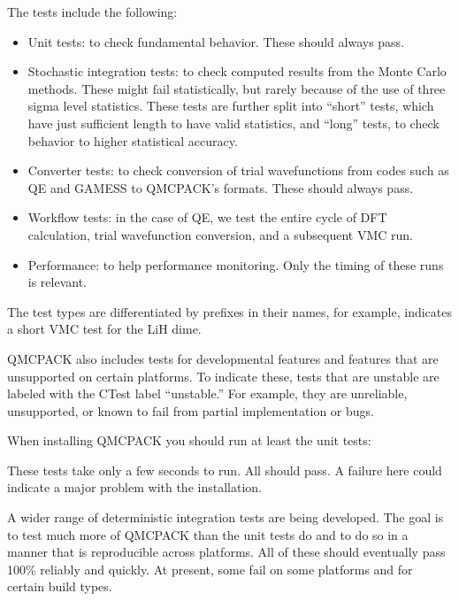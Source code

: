 \documentclass[letterpaper,10pt,english]{sphinxmanual}
\begin{document}
The tests include the following:
\begin{itemize}
\item {} 
Unit tests: to check fundamental behavior. These should always pass.

\item {} 
Stochastic integration tests: to check computed results from
the Monte Carlo methods. These might fail statistically, but rarely
because of the use of three sigma level statistics. These tests are
further split into “short” tests, which have just sufficient
length to have valid statistics, and “long” tests, to check
behavior to higher statistical accuracy.

\item {} 
Converter tests: to check conversion of trial wavefunctions
from codes such as QE and GAMESS to QMCPACK’s
formats. These should always pass.

\item {} 
Workflow tests: in the case of QE, we test the
entire cycle of DFT calculation, trial wavefunction conversion, and
a subsequent VMC run.

\item {} 
Performance: to help performance monitoring. Only the timing of
these runs is relevant.

\end{itemize}

The test types are differentiated by prefixes in their names, for example,  indicates a short VMC test
for the LiH dime.

QMCPACK also includes tests for developmental features and features
that are unsupported on certain platforms. To indicate these, tests
that are unstable are labeled with the CTest label
“unstable.” For example, they are unreliable, unsupported, or known to fail
from partial implementation or bugs.

When installing QMCPACK you should run at least the unit tests:

\begin{sphinxVerbatim}[commandchars=\\\{\}]
  
\end{sphinxVerbatim}

These tests take only a few seconds to run. All should pass. A
failure here could indicate a major problem with the installation.

A wider range of deterministic integration
tests are being developed. The goal is to test much more of QMCPACK than the unit tests
do and to do so in a manner that is reproducible
across platforms. All of these should eventually pass 100\% reliably
and quickly. At present, some fail on some platforms and for certain
build types.
\end{document}

